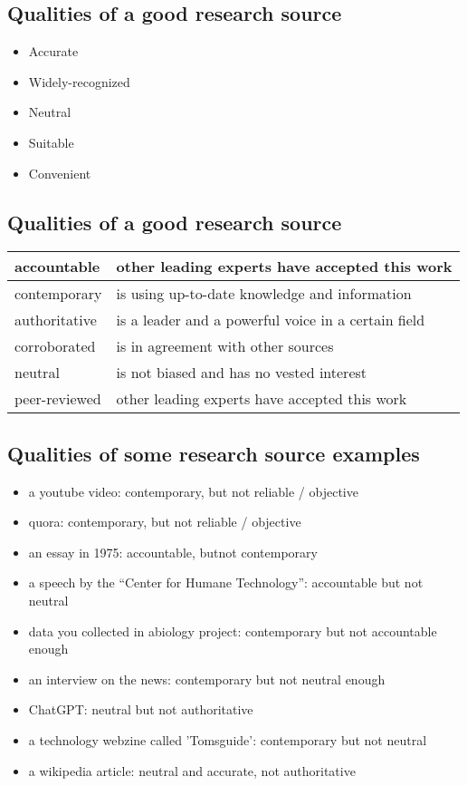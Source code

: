 \documentclass[a4paper]{article}
\begin{document}
\subsection{Qualities of a good research source}

\begin{itemize}
    \item Accurate
    \item Widely-recognized
    \item Neutral
    \item Suitable
    \item Convenient
\end{itemize}

\subsection{Qualities of a good research source}

\begin{table}[ht!]
\begin{tabular}{|l|l|}
\hline
accountable   & other leading experts have accepted this work       \\ \hline
contemporary  & is using up-to-date knowledge and information       \\ \hline
authoritative & is a leader and a powerful voice in a certain field \\ \hline
corroborated  & is in agreement with other sources                  \\ \hline
neutral       & is not biased and has no vested interest            \\ \hline
peer-reviewed & other leading experts have accepted this work       \\ \hline
\end{tabular}
\end{table}

\subsection{Qualities of some research source examples}

\begin{itemize}
    \item a youtube video: contemporary, but not reliable / objective
    \item quora: contemporary, but not reliable / objective
    \item an essay in 1975: accountable, butnot contemporary
    \item a speech by the “Center for Humane Technology”: accountable but not neutral
    \item data you collected in abiology project: contemporary but not  accountable enough
    \item an interview on the news: contemporary but not  neutral enough
    \item ChatGPT: neutral but not authoritative
    \item a technology webzine called 'Tomsguide': contemporary but not neutral
    \item a wikipedia article: neutral and accurate, not authoritative
\end{itemize}
\end{document}
